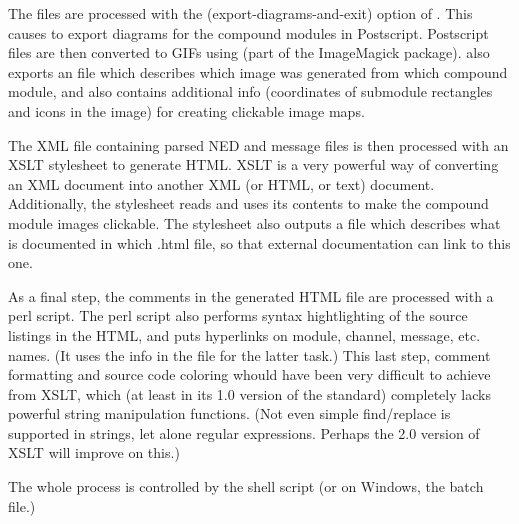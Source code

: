 The  files are processed with the  (export-diagrams-and-exit)
option of . This causes  to export diagrams for the
compound modules in Postscript. Postscript files are then converted
to GIFs using  (part of the ImageMagick package).
 also exports an  file which describes which
image was generated from which compound module, and also contains
additional info (coordinates of submodule rectangles and icons in the image)
for creating clickable image maps.

The XML file containing parsed NED and message files is then processed
with an XSLT stylesheet to generate HTML. XSLT is a very powerful way
of converting an XML document into another XML (or HTML, or text) document.
Additionally, the stylesheet reads  and uses its contents
to make the compound module images clickable.
The stylesheet also outputs a  file which describes what is documented
in which .html file, so that external documentation can link to this one.

As a final step, the comments in the generated HTML file are processed
with a perl script. The perl script also performs syntax hightlighting
of the source listings in the HTML, and puts hyperlinks on module,
channel, message, etc. names. (It uses the info in the  file
for the latter task.) This last step, comment formatting and source code
coloring whould have been very difficult to achieve from XSLT, which
(at least in its 1.0 version of the standard) completely lacks powerful
string manipulation functions. (Not even simple find/replace
is supported in strings, let alone regular expressions. Perhaps the
2.0 version of XSLT will improve on this.)

The whole process is controlled by the  shell script
(or on Windows, the  batch file.)





